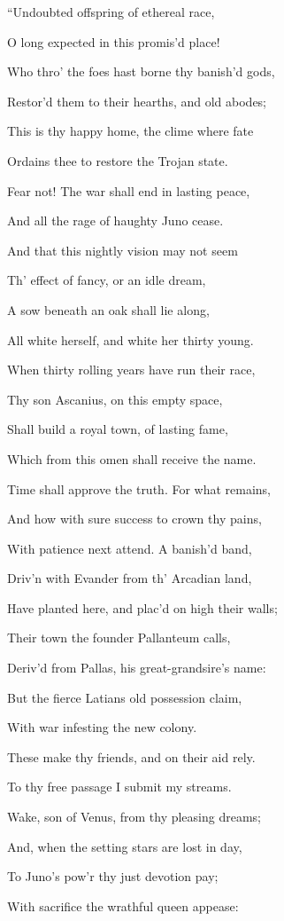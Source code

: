 “Undoubted offspring of ethereal race,

O long expected in this promis’d place!

Who thro’ the foes hast borne thy banish’d gods,

Restor’d them to their hearths, and old abodes;

This is thy happy home, the clime where fate

Ordains thee to restore the Trojan state.

Fear not! The war shall end in lasting peace,

And all the rage of haughty Juno cease.

And that this nightly vision may not seem

Th’ effect of fancy, or an idle dream,

A sow beneath an oak shall lie along,

All white herself, and white her thirty young.

When thirty rolling years have run their race,

Thy son Ascanius, on this empty space,

Shall build a royal town, of lasting fame,

Which from this omen shall receive the name.

Time shall approve the truth. For what remains,

And how with sure success to crown thy pains,

With patience next attend. A banish’d band,

Driv’n with Evander from th’ Arcadian land,

Have planted here, and plac’d on high their walls;

Their town the founder Pallanteum calls,

Deriv’d from Pallas, his great-grandsire’s name:

But the fierce Latians old possession claim,

With war infesting the new colony.

These make thy friends, and on their aid rely.

To thy free passage I submit my streams.

Wake, son of Venus, from thy pleasing dreams;

And, when the setting stars are lost in day,

To Juno’s pow’r thy just devotion pay;

With sacrifice the wrathful queen appease:

